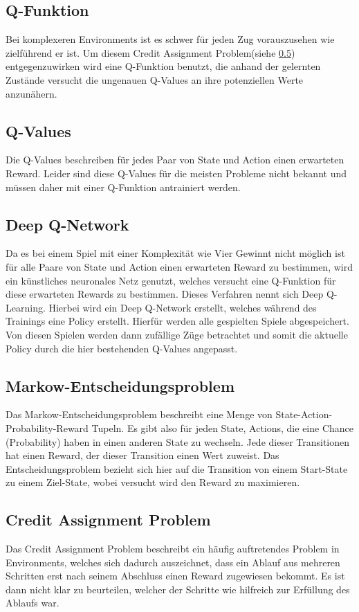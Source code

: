\subsection{Q-Funktion}
Bei komplexeren Environments ist es schwer für jeden Zug vorauszusehen wie zielführend er ist. Um diesem Credit Assignment Problem(siehe \ref{cap}) entgegenzuwirken wird eine Q-Funktion benutzt, die anhand der gelernten Zustände versucht die ungenauen Q-Values an ihre potenziellen Werte anzunähern.\cite{Sutton2018}

\subsection{Q-Values} \label{qvalue}
Die Q-Values beschreiben für jedes Paar von State und Action einen erwarteten Reward. Leider sind diese Q-Values für die meisten Probleme nicht bekannt und müssen daher mit einer Q-Funktion antrainiert werden.\cite{Sutton2018}

\subsection{Deep Q-Network}
Da es bei einem Spiel mit einer Komplexität wie Vier Gewinnt nicht möglich ist für alle Paare von State und Action einen erwarteten Reward zu bestimmen, wird ein künstliches neuronales Netz genutzt, welches versucht eine Q-Funktion für diese erwarteten Rewards zu bestimmen. Dieses Verfahren nennt sich Deep Q-Learning. Hierbei wird ein Deep Q-Network erstellt, welches während des Trainings eine Policy erstellt. Hierfür werden alle gespielten Spiele abgespeichert. Von diesen Spielen werden dann zufällige Züge betrachtet und somit die aktuelle Policy durch die hier bestehenden Q-Values angepasst.\cite{mnih2013playing}
\newpage
\subsection{Markow-Entscheidungsproblem}
Das Markow-Entscheidungsproblem beschreibt eine Menge von State-Action-Probability-Reward Tupeln. Es gibt also für jeden State, Actions, die eine Chance (Probability) haben in einen anderen State zu wechseln. Jede dieser Transitionen hat einen Reward, der dieser Transition einen Wert zuweist. Das Entscheidungsproblem bezieht sich hier auf die Transition von einem Start-State zu einem Ziel-State, wobei versucht wird den Reward zu maximieren.\cite{Martijn2012}

\subsection{Credit Assignment Problem} \label{cap}
Das Credit Assignment Problem beschreibt ein häufig auftretendes Problem in Environments, welches sich dadurch auszeichnet, dass ein Ablauf aus mehreren Schritten erst nach seinem Abschluss einen Reward zugewiesen bekommt. Es ist dann nicht klar zu beurteilen, welcher der Schritte wie hilfreich zur Erfüllung des Ablaufs war.\cite{agogino2004unifying}

